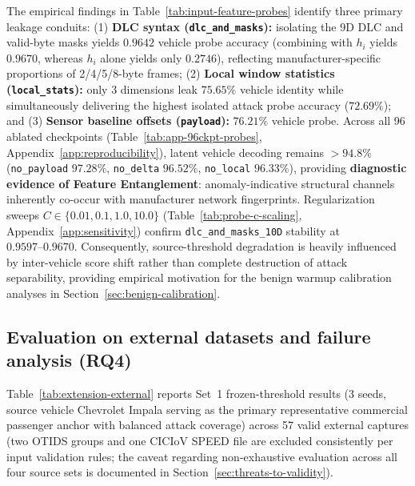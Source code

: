 \documentclass[12pt, a4paper, reqno, oneside]{book}
\DeclareRobustCommand{\code}[1]{\nolinkurl{#1}}
\begin{document}
The empirical findings in Table~\ref{tab:input-feature-probes} identify three primary leakage conduits: (1) \textbf{DLC syntax (\code{dlc\_and\_masks}):} isolating the 9D DLC and valid-byte masks yields $0.9642$ vehicle probe accuracy (combining with $h_i$ yields $0.9670$, whereas $h_i$ alone yields only $0.2746$), reflecting manufacturer-specific proportions of 2/4/5/8-byte frames; (2) \textbf{Local window statistics (\code{local\_stats}):} only 3 dimensions leak $75.65\%$ vehicle identity while simultaneously delivering the highest isolated attack probe accuracy ($72.69\%$); and (3) \textbf{Sensor baseline offsets (\code{payload}):} $76.21\%$ vehicle probe. Across all 96 ablated checkpoints (Table~\ref{tab:app-96ckpt-probes}, Appendix~\ref{app:reproducibility}), latent vehicle decoding remains $>94.8\%$ (\code{no\_payload} $97.28\%$, \code{no\_delta} $96.52\%$, \code{no\_local} $96.33\%$), providing \textbf{diagnostic evidence of Feature Entanglement}: anomaly-indicative structural channels inherently co-occur with manufacturer network fingerprints. Regularization sweeps $C \in \{0.01, 0.1, 1.0, 10.0\}$ (Table~\ref{tab:probe-c-scaling}, Appendix~\ref{app:sensitivity}) confirm \code{dlc\_and\_masks\_10D} stability at $0.9597\text{--}0.9670$. Consequently, source-threshold degradation is heavily influenced by inter-vehicle score shift rather than complete destruction of attack separability, providing empirical motivation for the benign warmup calibration analyses in Section~\ref{sec:benign-calibration}.

\subsection{Evaluation on external datasets and failure analysis (RQ4)}
Table~\ref{tab:extension-external} reports Set~1 frozen-threshold results (3 seeds, source vehicle Chevrolet Impala serving as the primary representative commercial passenger anchor with balanced attack coverage) across 57 valid external captures (two OTIDS groups and one CICIoV SPEED file are excluded consistently per input validation rules; the caveat regarding non-exhaustive evaluation across all four source sets is documented in Section~\ref{sec:threats-to-validity}).
\end{document}
